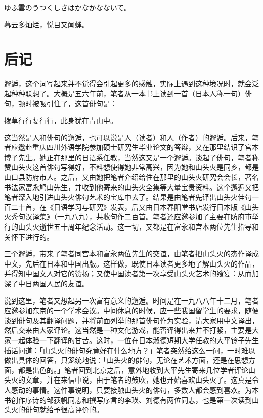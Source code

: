 \begin{haiku}
    {\FH ゆふ雲のうつくしさはかなかなないて。}

    {\FK 暮云多灿烂，悦目又闻蝉。}
\end{haiku}

\chapter{\FK 后记}

{\FS
    邂逅，这个词写起来并不觉得会引起更多的感触，实际上遇到这种境况时，就会泛起种种联想了。大概是五六年前，笔者从一本书上读到一首（日本人称一句）俳句，顿时被吸引住了，这首俳句是：

    拨草行行复行行，此身犹在青山中。

    这当然是人和俳句的邂逅，也可以说是人（读者）和人（作者）的邂逅。后来，笔者应邀赴重庆四川外语学院参加硕士研究生毕业论文的答辩，又在那里结识了宫本博子先生。她正在那里的日语系任教，当然这又是一个邂逅。谈起了俳句，笔者称赞山头火这首俳句写得好，不料想使得她非常高兴，因为她和山头火是同乡，都是山口县防府市人。之后，又由她把笔者介绍给住在那里的山头火研究会会长，著名书法家富永鸠山先生，并收到他寄来的山头火全集等大量宝贵资料。这个邂逅又把笔者深入地引进山头火俳句艺术的宝库中去了。结果是由笔者先译出山头火佳句一百二十首，在《日语学习与研究》发表，后又由日本春阳堂书店发行日本版《山头火秀句汉译集》（一九八九），共收句作二百首。笔者还应邀参加了主要在防府市举行的山头火逝世五十周年纪念活动。这一切，又都是在富永和宫本两位先生指导和关怀下进行的。

    三个邂逅，带来了笔者同宫本和富永两位先生的交谊，由笔者把山头火的杰作译成中文，先后在日本和中国出版。这样做，既使日本读者更多地了解山头火的作品，并得知中国文人对它的赞扬；又使中国读者第一次享受山头火艺术的飨宴：从而加深了中日两国人民的友谊。

    说到这里，笔者又想起另一次富有意义的邂逅。时间是在一九八八年十二月，笔者应邀参加东京的一个学术会议。中间休息的时候，应一些我国留学生的要求，随便谈到俳句及其翻译问题，并将前面列举的那首俳句作为实验，请大家用中文译出，然后交来由大家评论。这当然是一种文化游戏，能否译得出来并不打紧，主要是大家一起体验一下翻译的甘苦。这时，一位在日本淑德短期大学任教的大平铃子先生插话问道：「山头火的俳句究竟好在什么地方？」笔者突然给这么一问，一时难以做出具体的回答，只笼统地说：「山头火的俳句，无论在艺术方面，还是在思想方面，都是出色的。」笔者回到北京之后，意外地收到大平先生寄来几位学者评论山头火的文章，并在来信中说，由于笔者的鼓吹，她也开始喜欢山头火了。这真是令人感动的事情。这件事说明，只要接触山头火的俳句，多数人都会感到喜欢。为本书创作序诗的邹荻帆同志和撰写序言的李瑛、刘德有两位同志，也是第一次读到山头火的俳句就给予很高评价的。

}

